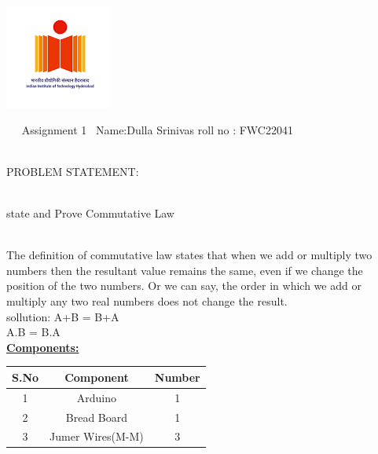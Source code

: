 \documentclass[letterpaper, 10 pt, conference]{ieeeconf}
\begin{document}
\raggedright \begin{left} \includegraphics[scale=0.90]{iit_h.png} \end{left}

\vspace{10mm}
\raggedright\textbf\ \hspace{1mm} \  Assignment 1\hspace{6cm}
 \  Name:\hspace{1mm}Dulla Srinivas\hspace{5cm} \hspace{4cm} 
roll no :\hspace{1mm} FWC22041\vspace{2cm}
\raggedright \\PROBLEM STATEMENT:\vspace{2mm}
\raggedright \\ state and Prove Commutative Law
\raggedright \\The definition of commutative law states that when we add or multiply two numbers then the resultant value remains the same, even if we change the position of the two numbers. Or we can say, the order in which we add or multiply any two real numbers does not change the result.
\vspace{1cm}
\\ sollution: A+B = B+A
 \\ \hspace{15mm} A.B = B.A
\vspace{5mm}
\\\textbf{\underline{Components:}}\vspace{2mm}
\begin{table}[ht]
\centering %
\begin{tabular}{c c c} %
\hline\hline %
S.No & Component & Number \\ [0.5ex] %
\hline
1 & Arduino & 1 \\
2 & Bread Board & 1 \\
3 & Jumer Wires(M-M) & 3\\
\hline
\end{tabular}
\end{table}
\end{document}
